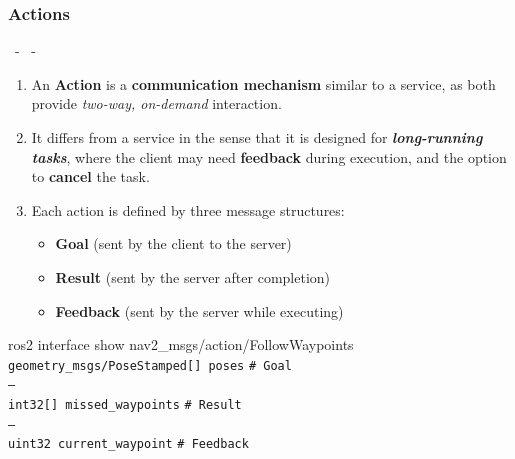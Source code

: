 \documentclass{beamer}
\begin{document}
\subsubsection{Actions}
\begin{frame}{\insertsection \ - \insertsubsection \ - \insertsubsubsection}
    \begin{enumerate}
        \item An \textbf{Action} is a \textbf{communication mechanism} similar to a service, as both provide \textit{two-way, on-demand} interaction.
        \item It differs from a service in the sense that it is designed for \textit{\textbf{long-running tasks}}, where the client may need
              \textbf{feedback} during execution, and the option to \textbf{cancel} the task.
        \item Each action is defined by three message structures:
              \begin{itemize}
                  \item \textbf{Goal} (sent by the client to the server)
                  \item \textbf{Result} (sent by the server after completion)
                  \item \textbf{Feedback} (sent by the server while executing)
              \end{itemize}
    \end{enumerate}
    \begin{block}{ros2 interface show nav2\_msgs/action/FollowWaypoints}
        \small
        \texttt{geometry\_msgs/PoseStamped[] poses} \hfill \texttt{\# Goal} \\
        \texttt{---} \\
        \texttt{int32[] missed\_waypoints} \hfill \texttt{\# Result} \\
        \texttt{---} \\
        \texttt{uint32 current\_waypoint} \hfill \texttt{\# Feedback} 
    \end{block}
\end{frame}
\end{document}
